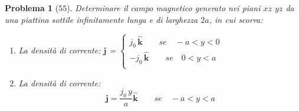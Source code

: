 \documentclass[a4paper,oneside]{article}
\newtheorem{problema}{Problema}
\renewcommand{\vec}[1]{\mathbf{#1}}
\renewcommand{\hat}[1]{\widehat{\mathbf{#1}}}
\begin{document}
\begin{problema}[$55$] 
	Determinare il campo magnetico generato nei piani 
	$xz$ $yz$ da una piattina sottile infinitamente 
	lunga e di larghezza $2a$, in cui scorra:
	\begin{enumerate}
		\item La densità di corrente: 
		$\vec{j}$ = $\begin{cases}
		j_{0}\,\hat{k}\qquad se \quad  -a < y < 0	\\
		-j_{0}\,\hat{k}\qquad se \quad  0 < y < a \\
		\end{cases}$
		\item La densità di corrente:
		\begin{equation}
		\vec{j} =\frac{j_{0}\,y}{a}\hat{k} \qquad se \quad  -a < y < a
		\end{equation}
	\end{enumerate}
\end{problema}
\end{document}
